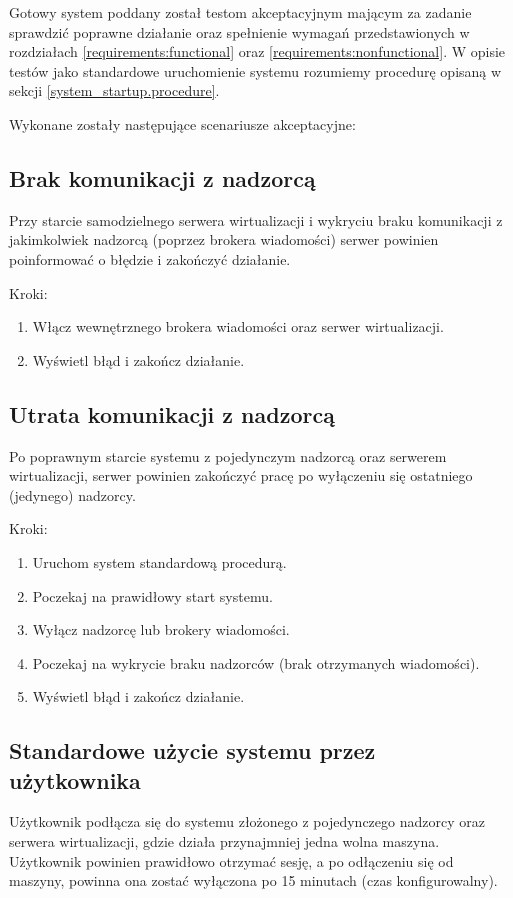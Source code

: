 \documentclass[../analiza-rozwiazania.tex]{subfiles}
\begin{document}
Gotowy system poddany został testom akceptacyjnym mającym za zadanie sprawdzić poprawne działanie oraz spełnienie wymagań przedstawionych w rozdziałach \ref{requirements:functional} oraz \ref{requirements:nonfunctional}.
W opisie testów jako standardowe uruchomienie systemu rozumiemy procedurę opisaną w sekcji \ref{system_startup.procedure}.

Wykonane zostały następujące scenariusze akceptacyjne:

\subsection{Brak komunikacji z nadzorcą}
Przy starcie samodzielnego serwera wirtualizacji i wykryciu braku komunikacji z jakimkolwiek nadzorcą (poprzez brokera wiadomości) serwer powinien poinformować o błędzie i zakończyć działanie.

Kroki:
\begin{enumerate}
  \item Włącz wewnętrznego brokera wiadomości oraz serwer wirtualizacji.
  \item Wyświetl błąd i zakończ działanie.
\end{enumerate}

\subsection{Utrata komunikacji z nadzorcą}
Po poprawnym starcie systemu z pojedynczym nadzorcą oraz serwerem wirtualizacji, serwer powinien zakończyć pracę po wyłączeniu się ostatniego (jedynego) nadzorcy.

Kroki:
\begin{enumerate}
  \item Uruchom system standardową procedurą.
  \item Poczekaj na prawidłowy start systemu.
  \item Wyłącz nadzorcę lub brokery wiadomości.
  \item Poczekaj na wykrycie braku nadzorców (brak otrzymanych wiadomości).
  \item Wyświetl błąd i zakończ działanie.
\end{enumerate}

\subsection{Standardowe użycie systemu przez użytkownika}
Użytkownik podłącza się do systemu złożonego z pojedynczego nadzorcy oraz serwera wirtualizacji, gdzie działa przynajmniej jedna wolna maszyna.
Użytkownik powinien prawidłowo otrzymać sesję, a po odłączeniu się od maszyny, powinna ona zostać wyłączona po 15 minutach (czas konfigurowalny).
\end{document}
